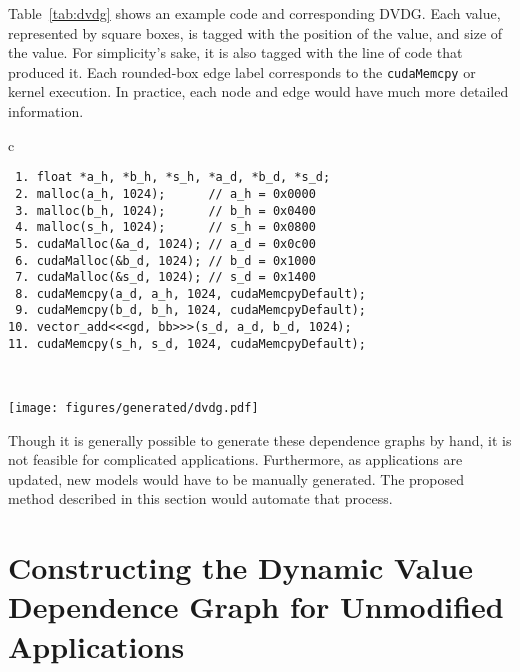 Table~\ref{tab:dvdg} shows an example code and corresponding DVDG.
Each value, represented by square boxes, is tagged with the position of the value, and size of the value.
For simplicity's sake, it is also tagged with the line of code that produced it.
Each rounded-box edge label corresponds to the \texttt{cudaMemcpy} or kernel execution.
In practice, each node and edge would have much more detailed information.

\begin{table}[ht]
	\centering
    \caption[Dynamic Value Dependence Graph]{
        Example of the dynamic value dependence graph for a simple vector add.
        Allocations in the code are commented with a hypothetical position of the allocation.
        Square blocks represent values, and rounded boxes represent node labels.
    }
    \label{tab:dvdg}
    \begin{tabular}{c}
        \begin{minipage}{\textwidth}
            \begin{lstlisting}
 1. float *a_h, *b_h, *s_h, *a_d, *b_d, *s_d;
 2. malloc(a_h, 1024);      // a_h = 0x0000
 3. malloc(b_h, 1024);      // b_h = 0x0400
 4. malloc(s_h, 1024);      // s_h = 0x0800
 5. cudaMalloc(&a_d, 1024); // a_d = 0x0c00  
 6. cudaMalloc(&b_d, 1024); // b_d = 0x1000
 7. cudaMalloc(&s_d, 1024); // s_d = 0x1400
 8. cudaMemcpy(a_d, a_h, 1024, cudaMemcpyDefault);
 9. cudaMemcpy(b_d, b_h, 1024, cudaMemcpyDefault);
10. vector_add<<<gd, bb>>>(s_d, a_d, b_d, 1024);
11. cudaMemcpy(s_h, s_d, 1024, cudaMemcpyDefault);
            \end{lstlisting}
        \end{minipage}        
    \\
        \begin{minipage}{\textwidth}
            \centering
            \texttt{[image: figures/generated/dvdg.pdf]}

        \end{minipage}

	\end{tabular}
\end{table}

Though it is generally possible to generate these dependence graphs by hand, it is not feasible for complicated applications.
Furthermore, as applications are updated, new models would have to be manually generated.
The proposed method described in this section would automate that process.

\section{Constructing the Dynamic Value Dependence Graph for Unmodified Applications}

